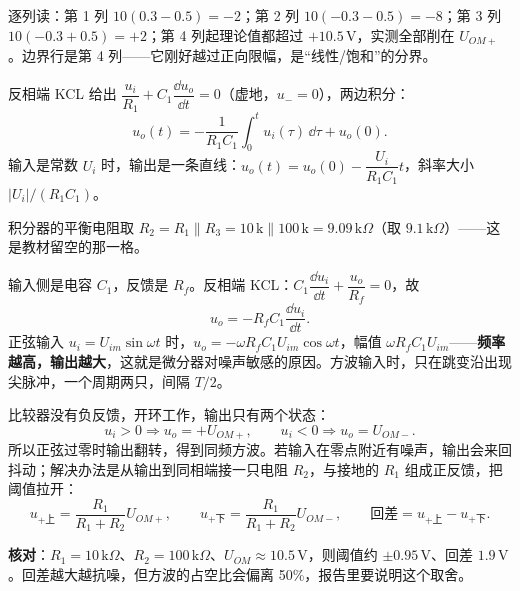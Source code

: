 \documentclass[11pt]{ctexart}
\let\origsubhdr\subhdr
\renewcommand{\subhdr}[1]{\needspace{3\baselineskip}\origsubhdr{#1}}
\begin{document}
\noindent 逐列读：第 1 列 $10(0.3-0.5)=-2$；第 2 列 $10(-0.3-0.5)=-8$；第 3 列 $10(-0.3+0.5)=+2$；第 4 列起理论值都超过 $+10.5\,\mathrm{V}$，实测全部削在 $U_{OM+}$。边界行是第 4 列——它刚好越过正向限幅，是“线性/饱和”的分界。


反相端 KCL 给出 $\dfrac{u_i}{R_1}+C_1\dfrac{\dd u_o}{\dd t}=0$（虚地，$u_-=0$），两边积分：
\[
u_o(t)=-\frac{1}{R_1C_1}\int_{0}^{t}u_i(\tau)\,\dd\tau+u_o(0).
\]
输入是常数 $U_i$ 时，输出是一条直线：$u_o(t)=u_o(0)-\dfrac{U_i}{R_1C_1}t$，斜率大小 $|U_i|/(R_1C_1)$。


积分器的平衡电阻取 $R_2=R_1\parallel R_3=10\,\mathrm{k}\parallel100\,\mathrm{k}=9.09\,\mathrm{k}\Omega$（取 $9.1\,\mathrm{k}\Omega$）——这是教材留空的那一格。


输入侧是电容 $C_1$，反馈是 $R_f$。反相端 KCL：$C_1\dfrac{\dd u_i}{\dd t}+\dfrac{u_o}{R_f}=0$，故
\[
u_o=-R_fC_1\frac{\dd u_i}{\dd t}.
\]
正弦输入 $u_i=U_{im}\sin\omega t$ 时，$u_o=-\omega R_fC_1U_{im}\cos\omega t$，幅值 $\omega R_fC_1U_{im}$——\textbf{频率越高，输出越大}，这就是微分器对噪声敏感的原因。方波输入时，只在跳变沿出现尖脉冲，一个周期两只，间隔 $T/2$。



比较器没有负反馈，开环工作，输出只有两个状态：
\[
u_i>0\Rightarrow u_o=+U_{OM+},\qquad u_i<0\Rightarrow u_o=U_{OM-}.
\]
所以正弦过零时输出翻转，得到同频方波。若输入在零点附近有噪声，输出会来回抖动；解决办法是从输出到同相端接一只电阻 $R_2$，与接地的 $R_1$ 组成正反馈，把阈值拉开：
\[
u_{+\text{上}}=\frac{R_1}{R_1+R_2}U_{OM+},\qquad
u_{+\text{下}}=\frac{R_1}{R_1+R_2}U_{OM-},\qquad
\text{回差}= u_{+\text{上}}-u_{+\text{下}} .
\]

\textbf{核对}：$R_1=10\,\mathrm{k}\Omega$、$R_2=100\,\mathrm{k}\Omega$、$U_{OM}\approx10.5\,\mathrm{V}$，则阈值约 $\pm0.95\,\mathrm{V}$、回差 $1.9\,\mathrm{V}$。回差越大越抗噪，但方波的占空比会偏离 50\%，报告里要说明这个取舍。
\end{document}
